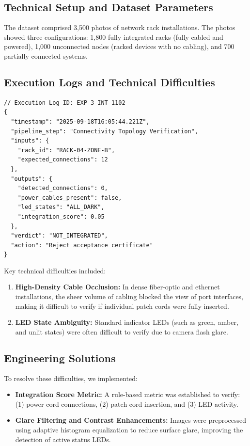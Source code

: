 \documentclass[11pt,letterpaper]{report}
\begin{document}
\subsection{Technical Setup and Dataset Parameters}
The dataset comprised 3,500 photos of network rack installations. The photos showed three configurations: 1,800 fully integrated racks (fully cabled and powered), 1,000 unconnected nodes (racked devices with no cabling), and 700 partially connected systems.

\subsection{Execution Logs and Technical Difficulties}

\begin{listing}[htbp]
\begin{verbatim}
// Execution Log ID: EXP-3-INT-1102
{
  "timestamp": "2025-09-18T16:05:44.221Z",
  "pipeline_step": "Connectivity Topology Verification",
  "inputs": {
    "rack_id": "RACK-04-ZONE-B",
    "expected_connections": 12
  },
  "outputs": {
    "detected_connections": 0,
    "power_cables_present": false,
    "led_states": "ALL_DARK",
    "integration_score": 0.05
  },
  "verdict": "NOT_INTEGRATED",
  "action": "Reject acceptance certificate"
}
\end{verbatim}
\caption{System execution log flagging racked hardware that lacks power and network connections.}
\label{lst:log_connectivity}
\end{listing}

Key technical difficulties included:
\begin{enumerate}
    \item \textbf{High-Density Cable Occlusion:} In dense fiber-optic and ethernet installations, the sheer volume of cabling blocked the view of port interfaces, making it difficult to verify if individual patch cords were fully inserted.
    \item \textbf{LED State Ambiguity:} Standard indicator LEDs (such as green, amber, and unlit states) were often difficult to verify due to camera flash glare.
\end{enumerate}

\subsection{Engineering Solutions}
To resolve these difficulties, we implemented:
\begin{itemize}
    \item \textbf{Integration Score Metric:} A rule-based metric was established to verify: (1) power cord connections, (2) patch cord insertion, and (3) LED activity.
    \item \textbf{Glare Filtering and Contrast Enhancements:} Images were preprocessed using adaptive histogram equalization to reduce surface glare, improving the detection of active status LEDs.
\end{itemize}
\end{document}
